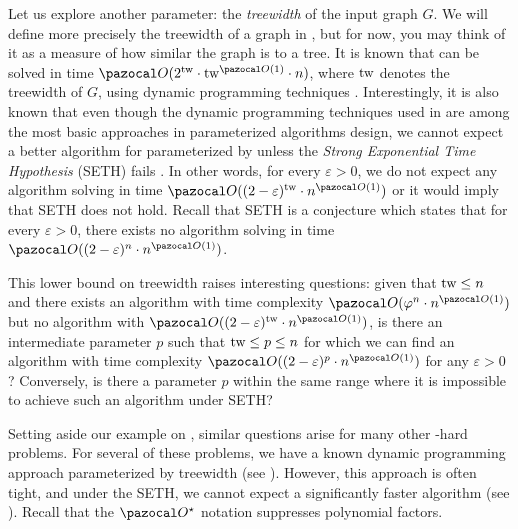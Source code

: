 Let us explore another parameter: the \textit{treewidth} of the input graph $G$. We will define more precisely the treewidth of a graph in , but for now, you may think of it as a measure of how similar the graph is to a tree. It is known that  can be solved in time $\O(2^{\tw}\cdot\tw^{\O(1)}\cdot n)$, where $\text{tw}$ denotes the treewidth of $G$, using dynamic programming techniques \cite[Corollary~7.6]{cygan2015parameterized}. Interestingly, it is also known that even though the dynamic programming techniques used in \cite[Corollary~7.6]{cygan2015parameterized} are among the most basic approaches in parameterized algorithms design, we cannot expect a better algorithm for  parameterized by \tw{} unless the \textit{Strong Exponential Time Hypothesis} (SETH) fails \cite{lokshtanov2011known}. In other words, for every $\varepsilon > 0$, we do not expect any algorithm solving  in time $\O((2-\varepsilon)^\tw \cdot n^{\O(1)})$ or it would imply that SETH does not hold. Recall that SETH is a conjecture which states that for every $\varepsilon > 0$, there exists no algorithm solving  in time $\O((2 - \varepsilon)^n\cdot n^{\O(1)})$.

This lower bound on treewidth raises interesting questions: given that $\text{tw}{} \leq n$ and there exists an algorithm with time complexity $\O(\varphi^n \cdot n^{\O(1)})$ but no algorithm with $\O((2 - \varepsilon)^\tw  \cdot n^{\O(1)})$, is there an intermediate parameter $p$ such that $\text{tw} \leq p \leq n$ for which we can find an algorithm with time complexity $\O((2 - \varepsilon)^p \cdot n^{\O(1)})$ for any $\varepsilon > 0$?  Conversely, is there a parameter $p$ within the same range where it is impossible to achieve such an algorithm under SETH?

\medskip

Setting aside our example on , similar questions arise for many other \NP-hard problems. For several of these problems, we have a known dynamic programming approach parameterized by treewidth (see ). However, this approach is often tight, and under the SETH, we cannot expect a significantly faster algorithm (see ). Recall that the $\O^\star$ notation suppresses polynomial factors.

